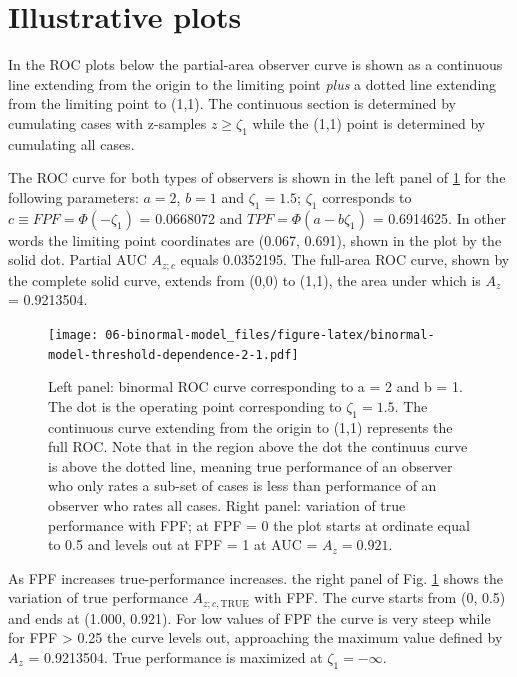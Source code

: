 \documentclass[
]{book}
\begin{document}
\hypertarget{binormal-model-illustrative-plots}{%
\section{Illustrative plots}\label{binormal-model-illustrative-plots}}

In the ROC plots below the partial-area observer curve is shown as a continuous line extending from the origin to the limiting point \emph{plus} a dotted line extending from the limiting point to (1,1). The continuous section is determined by cumulating cases with z-samples \(z \ge \zeta_1\) while the (1,1) point is determined by cumulating all cases.

The ROC curve for both types of observers is shown in the left panel of \ref{fig:binormal-model-threshold-dependence-2} for the following parameters: \(a = 2\), \(b = 1\) and \(\zeta_1 = 1.5\); \(\zeta_1\) corresponds to \(c \equiv FPF = \Phi(-\zeta_1)\) = 0.0668072 and \(TPF = \Phi(a - b\zeta_1)\) = 0.6914625. In other words the limiting point coordinates are (0.067, 0.691), shown in the plot by the solid dot. Partial AUC \(A_{z;c}\) equals 0.0352195. The full-area ROC curve, shown by the complete solid curve, extends from (0,0) to (1,1), the area under which is \(A_z\) = 0.9213504.

\begin{figure}
\centering
\texttt{[image: 06-binormal-model\_files/figure-latex/binormal-model-threshold-dependence-2-1.pdf]}
\caption{\label{fig:binormal-model-threshold-dependence-2}Left panel: binormal ROC curve corresponding to a = 2 and b = 1. The dot is the operating point corresponding to \(\zeta_1 = 1.5\). The continuous curve extending from the origin to (1,1) represents the full ROC. Note that in the region above the dot the continuus curve is above the dotted line, meaning true performance of an observer who only rates a sub-set of cases is less than performance of an observer who rates all cases. Right panel: variation of true performance with FPF; at FPF = 0 the plot starts at ordinate equal to 0.5 and levels out at FPF = 1 at AUC = \(A_z = 0.921.\)}
\end{figure}

As FPF increases true-performance increases. the right panel of Fig. \ref{fig:binormal-model-threshold-dependence-2} shows the variation of true performance \(A_{z;c,\text{TRUE}}\) with FPF. The curve starts from (0, 0.5) and ends at (1.000, 0.921). For low values of FPF the curve is very steep while for FPF \textgreater{} 0.25 the curve levels out, approaching the maximum value defined by \(A_z\) = 0.9213504. True performance is maximized at \(\zeta_1 = -\infty\).
\end{document}
